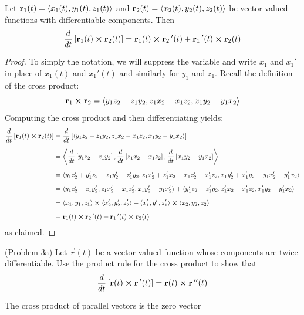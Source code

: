\documentclass[handout]{ximera}
\begin{document}
\begin{proposition}
Let $\mathbf r_1(t) = \left\langle x_1(t), y_1(t),z_1(t)\right\rangle$ and $\mathbf r_2(t) = \left\langle x_2(t), y_2(t),z_2(t)\right\rangle$ be vector-valued functions with differentiable components.
Then
\[
\frac{d}{dt}\left[\mathbf r_1(t) \boldsymbol\times \mathbf r_2(t)\right] = \mathbf r_1(t) \boldsymbol\times \mathbf r_2\,'(t) + \mathbf r_1\,'(t) \boldsymbol\times \mathbf r_2(t)
\]
\end{proposition}
\begin{proof}
To simply the notation, we will suppress the variable and write $x_1$ and $x_1'$ in place of $x_1(t)$ and $x_1'(t)$ and similarly for $y_1$ and $z_1$.
Recall the definition of the cross product:
\[
\mathbf{r}_1 \boldsymbol\times \mathbf{r}_2 =  \left\langle y_1z_2 - z_1y_2, z_1x_2 - x_1z_2, x_1y_2 - y_1x_2\right\rangle
\]
Computing the cross product and then differentiating yields:
\begin{align*}
\frac{d}{dt}\left[\mathbf r_1(t) \boldsymbol\times \mathbf r_2(t)\right] &= \frac{d}{dt} \left[ \left\langle y_1z_2 - z_1y_2, z_1x_2 - x_1z_2, x_1y_2 - y_1x_2\right\rangle\right]\\[6pt]
&=  \left\langle \frac{d}{dt} \left[y_1z_2 - z_1y_2\right], \frac{d}{dt} \left[z_1x_2 - x_1z_2\right],\frac{d}{dt} \left[x_1y_2 - y_1x_2\right]\right\rangle\\[6pt]
&= \left\langle y_1z_2' + y_1'z_2- z_1y_2'  - z_1'y_2,  z_1x_2' + z_1'x_2- x_1z_2'  - x_1'z_2, x_1y_2' +x_1'y_2- y_1x_2'  - y_1'x_2      \right\rangle\\[6pt]
&=\left\langle y_1z_2' - z_1y_2'  ,  z_1x_2' - x_1z_2', x_1y_2' - y_1x_2'\right\rangle+ \left\langle  y_1'z_2  - z_1'y_2, z_1'x_2 - x_1'z_2, x_1'y_2 - y_1'x_2\right\rangle\\[6pt]
&= \left\langle x_1, y_1, z_1\right\rangle\boldsymbol\times \left\langle x_2', y_2', z_2'\right\rangle + \left\langle x_1', y_1', z_1'\right\rangle\boldsymbol\times \left\langle x_2, y_2, z_2\right\rangle\\[6pt]
&= \mathbf r_1(t) \boldsymbol\times \mathbf r_2\,'(t) + \mathbf r_1\,'(t) \boldsymbol\times \mathbf r_2(t)
\end{align*}
as claimed.


\end{proof}





\begin{problem}(Problem 3a)
Let $\vec r(t)$ be a vector-valued function whose components are twice differentiable. Use the product rule for the cross product to show that
\[
\frac{d}{dt}\left[\mathbf r(t) \boldsymbol\times \mathbf r\,'(t) \right] = \mathbf r(t) \boldsymbol\times \mathbf r\,''(t)
\]
\begin{hint}
The cross product of parallel vectors is the zero vector
\end{hint}
\end{problem}
\end{document}
